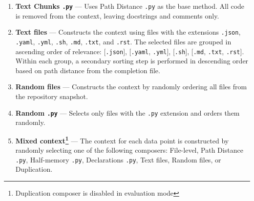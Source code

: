 \begin{enumerate}
    \item \textbf{Text Chunks \texttt{.py}} — Uses Path Distance \texttt{.py} as the base method. All code is removed from the context, leaving docstrings and comments only.
    
    \item \textbf{Text files} — Constructs the context using files with the extensions \texttt{.json}, \texttt{.yaml}, \texttt{.yml}, \texttt{.sh}, \texttt{.md}, \texttt{.txt}, and \texttt{.rst}. The selected files are grouped in ascending order of relevance: [\texttt{.json}], [\texttt{.yaml}, \texttt{.yml}], [\texttt{.sh}], [\texttt{.md}, \texttt{.txt}, \texttt{.rst}]. Within each group, a secondary sorting step is performed in descending order based on path distance from the completion file.
    
    \item \textbf{Random files} — Constructs the context by randomly ordering all files from the repository snapshot.
    
    \item \textbf{Random \texttt{.py}} — Selects only files with the \texttt{.py} extension and orders them randomly.

    \item \textbf{Mixed context\footnote{Duplication composer is disabled in evaluation mode}} — The context for each data point is constructed by randomly selecting one of the following composers: File-level, Path Distance \texttt{.py}, Half-memory \texttt{.py}, Declarations \texttt{.py}, Text files, Random files, or Duplication.

\end{enumerate}

